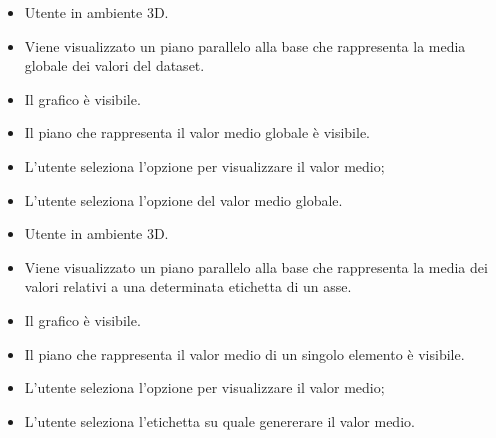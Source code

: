 \UCdsc
{ %
    \begin{itemize}
        \item Utente in ambiente 3D.
    \end{itemize}
}
{ %
    \begin{itemize}
        \item Viene visualizzato un piano parallelo alla base che rappresenta la media globale dei valori del dataset.
    \end{itemize}
}
{ %
    \begin{itemize}
        \item Il grafico è visibile.
    \end{itemize}
}
{ %
    \begin{itemize}
        \item Il piano che rappresenta il valor medio globale è visibile.
    \end{itemize}
}
{ %
    \begin{itemize}
        \item L'utente seleziona l'opzione per visualizzare il valor medio;
        \item L'utente seleziona l'opzione del valor medio globale.
    \end{itemize}
}

\UCdsc
{ %
    \begin{itemize}
        \item Utente in ambiente 3D.
    \end{itemize}
}
{ %
    \begin{itemize}
        \item Viene visualizzato un piano parallelo alla base che rappresenta la media dei valori relativi a una determinata etichetta di un asse.
    \end{itemize}
}
{ %
    \begin{itemize}
        \item Il grafico è visibile.
    \end{itemize}
}
{ %
    \begin{itemize}
        \item Il piano che rappresenta il valor medio di un singolo elemento è visibile.
    \end{itemize}
}
{ %
    \begin{itemize}
        \item L'utente seleziona l'opzione per visualizzare il valor medio;
        \item L'utente seleziona l'etichetta su quale genererare il valor medio.
    \end{itemize}
}








